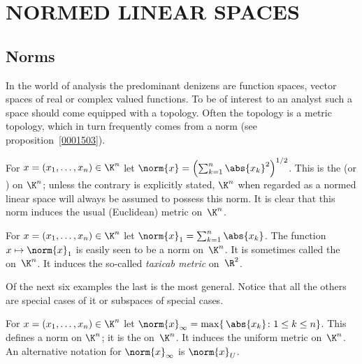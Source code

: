 \chapter{NORMED LINEAR SPACES}

\section{Norms}
In the world of analysis the predominant denizens are function spaces, vector spaces of
real or complex valued functions. To be of interest to an analyst such a space should
come equipped with a topology.  Often the topology is a metric topology, which in turn
frequently comes from a norm (see proposition~\ref{0001503}).

\begin{exam}\label{C023125}  For $x = (x_1,\dots, x_n) \in \K^n$ let $\norm{x} =
\left(\sum_{k=1}^n {\abs{x_k}}^2\right)^{1/2}$.  This is the
 (or
) on $\K^n$; unless the contrary is explicitly stated, $\K^n$ when
regarded as a normed linear space will always be assumed to possess this norm.  It is
clear that this norm induces the usual (Euclidean) metric on~$\K^n$.
\end{exam}

\begin{exam}\label{C023127}  For $x = (x_1,\dots,x_n) \in \K^n$ let
$\norm{x}_1 = \sum_{k=1}^n \abs{x_k}$.  The function $x \mapsto \norm{x}_1$ is easily
seen to be a norm on~$\K^n$. It is sometimes called
the  on~$\K^n$.  It induces the so-called \emph{taxicab metric} on~$\R^2$.
\end{exam}

Of the next six examples the last is the most general.  Notice that all the others are special cases of it
or subspaces of special cases.

\begin{exam}\label{C023129}  For $x = (x_1,\dots,x_n) \in \K^n$ let
$\norm{x}_\infty = \max\{\,\abs{x_k} \colon 1 \le k \le n\}$.  This defines a norm on $\K^n$;
it is the
 on~$\K^n$.  It induces the uniform metric on~$\K^n$.  An alternative notation for
$\norm{x}_\infty$ is $\norm{x}_U$.
\end{exam}


